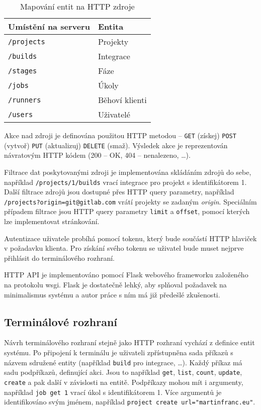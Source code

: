 \begin{table}[ht]
\centering
\caption{Mapování entit na HTTP zdroje}
\begin{tabular}{|l|l|}
\hline
Umístění na serveru & Entita \\ \hline
\verb|/projects| & Projekty \\ \hline
\verb|/builds| & Integrace \\ \hline
\verb|/stages| & Fáze \\ \hline
\verb|/jobs| & Úkoly \\ \hline
\verb|/runners| & Běhoví klienti \\ \hline
\verb|/users| & Uživatelé \\ \hline
\end{tabular}
\end{table}

Akce nad zdroji je definována použitou HTTP metodou -- \verb|GET| (získej) \verb|POST| (vytvoř) \verb|PUT| (aktualizuj) \verb|DELETE| (smaž).
Výsledek akce je reprezentován návratovým HTTP kódem (200 -- OK, 404 -- nenalezeno, \ldots).

Filtrace dat poskytovanými zdroji je implementována skládáním zdrojů do sebe, například \verb|/projects/1/builds| vrací integrace pro projekt s identifikátorem 1.
Další filtrace zdrojů jsou dostupné přes HTTP query parametry, například \verb|/projects?origin=git@gitlab.com| vrátí projekty se zadaným \textit{origin}.
Speciálním případem filtrace jsou HTTP query parametry \verb|limit| a \verb|offset|, pomocí kterých lze implementovat stránkování.

Autentizace uživatele probíhá pomocí tokenu, který bude součástí HTTP hlaviček v požadavku klienta.
Pro získání svého tokenu se uživatel bude muset nejprve přihlásit do terminálového rozhraní.


HTTP API je implementováno pomocí Flask webového frameworku založeného na protokolu wsgi.
Flask je dostatečně lehký, aby splňoval požadavek na minimalismus systému a autor práce s ním má již předešlé zkušenosti.

\subsection{Terminálové rozhraní}

Návrh terminálového rozhraní stejně jako HTTP rozhraní vychází z definice entit systému.
Po připojení k terminálu je uživateli zpřístupněna sada příkazů s názvem sdružené entity (například \verb|build| pro integrace, \ldots).
Každý příkaz má sadu podpříkazů, definující akci.
Jsou to například \verb|get|, \verb|list|, \verb|count|, \verb|update|, \verb|create| a pak další v závislosti na entitě.
Podpříkazy mohou mít i argumenty, například \verb|job get 1| vrací úkol s identifikátorem 1.
Více argumentů je identifikováno svým jménem, například \verb|project create url="martinfranc.eu"|.

